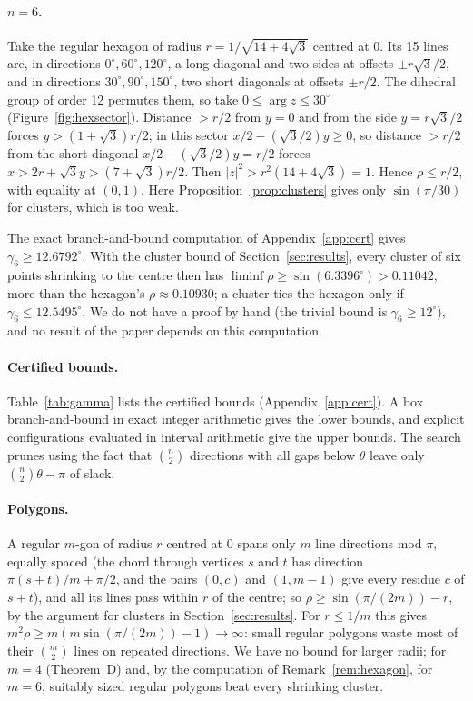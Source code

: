 \documentclass[11pt]{article}
\begin{document}
\paragraph{$n=6$.} Take the regular hexagon of radius $r=1/\sqrt{14+4\sqrt3}$ centred at $0$. Its 15
lines are, in directions $0^\circ,60^\circ,120^\circ$, a long diagonal and two sides at offsets
$\pm r\sqrt3/2$, and in directions $30^\circ,90^\circ,150^\circ$, two short diagonals at offsets
$\pm r/2$. The dihedral group of order 12 permutes them, so take $0\le\arg z\le30^\circ$ (Figure~\ref{fig:hexsector}). Distance
$>r/2$ from $y=0$ and from the side $y=r\sqrt3/2$ forces $y>(1+\sqrt3)r/2$; in this sector
$x/2-(\sqrt3/2)y\ge0$, so distance $>r/2$ from the short diagonal $x/2-(\sqrt3/2)y=r/2$ forces
$x>2r+\sqrt3y>(7+\sqrt3)r/2$. Then $|z|^2>r^2(14+4\sqrt3)=1$. Hence $\rho\le r/2$, with equality at
$(0,1)$. Here Proposition~\ref{prop:clusters} gives only $\sin(\pi/30)$ for clusters, which is too weak.

\begin{remark}\label{rem:hexagon}
The exact branch-and-bound computation of Appendix~\ref{app:cert} gives $\gamma_6\ge12.6792^\circ$. With the cluster bound of
Section~\ref{sec:results}, every cluster of six points shrinking to the centre then has
$\liminf\rho\ge\sin(6.3396^\circ)>0.11042$, more than the hexagon's $\rho\approx0.10930$; a cluster ties the hexagon only if
$\gamma_6\le12.5495^\circ$. We do not have a proof by hand (the trivial bound is $\gamma_6\ge12^\circ$), and no result of
the paper depends on this computation.
\end{remark}

\paragraph{Certified bounds.} Table~\ref{tab:gamma} lists the certified bounds (Appendix~\ref{app:cert}). A box branch-and-bound in exact integer arithmetic
gives the lower bounds, and explicit configurations evaluated in interval arithmetic give the upper
bounds. The search prunes using the fact that $\binom n2$ directions with all gaps below $\theta$
leave only $\binom n2\theta-\pi$ of slack.
\paragraph{Polygons.} A regular $m$-gon of radius $r$ centred at $0$ spans only $m$ line directions mod
$\pi$, equally spaced (the chord through vertices $s$ and $t$ has direction $\pi(s+t)/m+\pi/2$, and the
pairs $(0,c)$ and $(1,m-1)$ give every residue $c$ of $s+t$), and all its lines pass within $r$ of the
centre; so $\rho\ge\sin(\pi/(2m))-r$, by the argument for clusters in Section~\ref{sec:results}. For $r\le1/m$ this gives
$m^2\rho\ge m(m\sin(\pi/(2m))-1)\to\infty$: small regular polygons waste most of their $\binom m2$
lines on repeated directions. We have no bound for larger radii; for $m=4$ (Theorem~D) and, by the
computation of Remark~\ref{rem:hexagon}, for $m=6$, suitably sized regular polygons beat every shrinking cluster.
\end{document}
